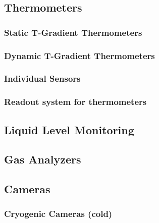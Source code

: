 \subsection{Thermometers}
\label{sec:fddp-slow-cryo-therm}


\subsubsection{Static T-Gradient Thermometers}

\subsubsection{Dynamic T-Gradient Thermometers}

\subsubsection{Individual Sensors}

\subsubsection{Readout system for thermometers}


\subsection{Liquid Level Monitoring}
\label{sec:fddp-slow-cryo-liq-lev}

\subsection{Gas Analyzers}
\label{sec:fddp-slow-cryo-gas-anlyz}

\subsection{Cameras}
\label{sec:fddp-slow-cryo-cameras}

\subsubsection{Cryogenic Cameras (cold)}

